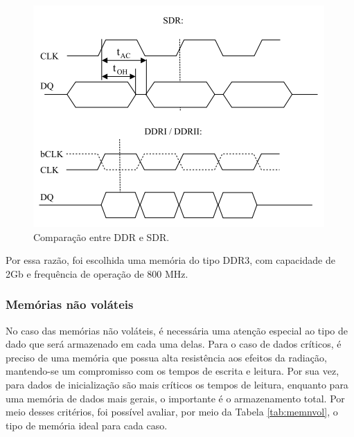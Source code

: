 \begin{figure}[H]
    \centering
    \includegraphics[scale=1]{images/ddrsdr.png}
    \caption{Comparação entre DDR e SDR.}
    \label{fig:sdrvsddr}
\end{figure}
 
Por essa razão, foi escolhida uma memória do tipo DDR3, com capacidade de 2Gb e frequência de operação de 800 MHz.

\subsubsection{Memórias não voláteis}

No caso das memórias não voláteis, é necessária uma atenção especial ao tipo de dado que será armazenado em cada uma delas. Para o caso de dados críticos, é preciso de uma memória que possua alta resistência aos efeitos da radiação, mantendo-se um compromisso com os tempos de escrita e leitura. Por sua vez, para dados de inicialização são mais críticos os tempos de leitura, enquanto para uma memória de dados mais gerais, o importante é o armazenamento total. Por meio desses critérios, foi possível avaliar, por meio da Tabela \ref{tab:memnvol}, o tipo de memória ideal para cada caso.

